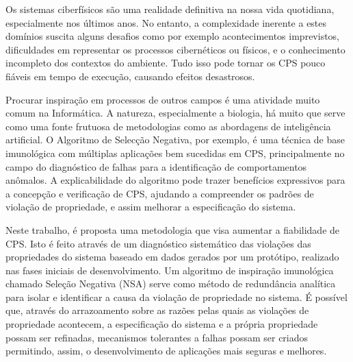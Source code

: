 Os sistemas ciberfísicos são uma realidade definitiva na nossa vida quotidiana, especialmente nos últimos anos. No entanto, a complexidade inerente a estes domínios suscita alguns desafios como por exemplo acontecimentos imprevistos, dificuldades em representar os processos cibernéticos ou físicos, e o conhecimento incompleto dos contextos do ambiente. Tudo isso pode tornar os CPS pouco fiáveis em tempo de execução, causando efeitos desastrosos. 

Procurar inspiração em processos de outros campos é uma atividade muito comum na Informática. A natureza, especialmente a biologia, há muito que serve como uma fonte frutuosa de metodologias como as abordagens de inteligência artificial. O Algoritmo de Selecção Negativa, por exemplo, é uma técnica de base imunológica com múltiplas aplicações bem sucedidas em CPS, principalmente no campo do diagnóstico de falhas para a identificação de comportamentos anômalos. A explicabilidade do algoritmo pode trazer benefícios expressivos para a concepção e verificação de CPS, ajudando a compreender os padrões de violação de propriedade, e assim melhorar a especificação do sistema.

Neste trabalho, é proposta uma metodologia que visa aumentar a fiabilidade de CPS. Isto é feito através de um diagnóstico sistemático das violações das propriedades do sistema baseado em dados gerados por um protótipo, realizado nas fases iniciais de desenvolvimento. Um algoritmo de inspiração imunológica chamado Seleção Negativa (NSA) serve como método de redundância analítica para isolar e identificar a causa da violação de propriedade no sistema. É possível que, através do arrazoamento sobre as razões pelas quais as violações de propriedade acontecem, a especificação do sistema e a própria propriedade possam ser refinadas, mecanismos tolerantes a falhas possam ser criados permitindo, assim, o desenvolvimento de aplicações mais seguras e melhores.
